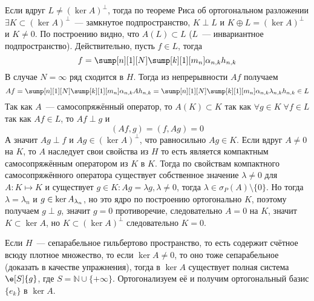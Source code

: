 \documentclass[14pt]{extarticle}
\begin{document}
\begin{Proof}
    Если вдруг $L \ne (\ker A)^\perp$, тогда по теореме Риса об ортогональном 
    разложении $\exists K \subset (\ker A)^\perp$~--- замкнутое подпространство,
    $K \perp L$ и $K \oplus L = (\ker A)^\perp$ и $K \ne 0$.
    По построению видно, что $A(L) \subset L$ ($L$~--- инвариантное
    подпространство).
    Действительно, пусть $f \in L$, тогда
    $$
    f = \sump[n][1][N] \sump[k][1][m_n] \alpha_{n,k} h_{n, k}
    $$
    В случае $N = \infty$  ряд сходится в $H$.
    Тогда из непрерывности $Af$ получаем
    $$
    Af = \sump[n][1][N] \sump[k][1][m_n] \alpha_{n,k} A h_{n, k} =
    \sump[n][1][N] \sump[k][1][m_n] \alpha_{n,k} \lambda_{n, k} h_{n, k} \in L
    $$
    Так как $A$~--- самосопряжённый оператор, то $A(K) \subset K$ так как
    $\forall g \in K\;\forall f \in L$ так как $Af \in L$, то $Af \perp g$ и
    $$
    (Af, g) = (f, Ag) = 0
    $$
    А значит $Ag \perp f$ и $Ag \in (\ker A)^\perp$, что равносильно $Ag \in K$.
    Если вдруг $A \ne 0$ на $K$, то $A$ наследует свои свойства из $H$ то есть
    является компактным самосопряжённым оператором из $K$ в $K$.
    Тогда по свойствам компактного самосопряжённого оператора существует
    собственное значение $\lambda \neq 0$ для $A : K \mapsto K$ и
    существует $g \in K\colon Ag = \lambda g, \lambda \ne 0$, тогда 
    $\lambda \in \sigma_P(A)\setminus\{0\}$.
    Но тогда $\lambda = \lambda_n$ и $g \in \ker \Al[n]$, но это ядро по 
    построению ортогонально $K$, поэтому получаем $g \perp g$, значит
    $g = 0$ противоречие, следовательно $A = 0$ на $K$, значит
    $K \subset \ker A$, но $K \subset (\ker A)^\perp$ следовательно $K = 0$.
\end{Proof}

Если $H$~--- сепарабельное гильбертово пространство, то есть содержит
счётное всюду плотное множество, то если $\ker A \ne 0$, то оно тоже
сепарабельное (доказать в качестве упражнения), тогда в $\ker A$ существует
полная система $\e[S]{g}$, где $S = \mathbb N \cup \{+\infty\}$.
Ортогонализуем её и получим ортогональный базис $\{e_k\}$ в $\ker A$.
\end{document}
